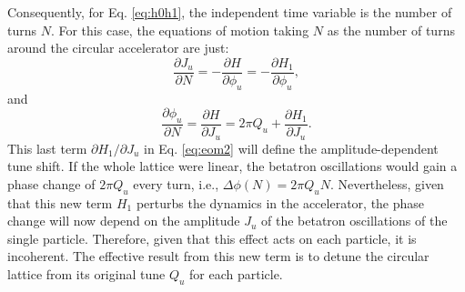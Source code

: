 Consequently, for Eq. \ref{eq:h0h1}, the independent time variable is the number of turns $N$. For this case, the equations of motion taking $N$ as the number of turns around the circular accelerator are just:
\begin{equation}
    \label{eq:eom1}
    \frac{\partial J_u}{\partial N} = -\frac{\partial H}{\partial \phi_u} = -\frac{\partial H_1}{\partial \phi_u},
\end{equation}
and
\begin{equation}
    \label{eq:eom2}
    \frac{\partial \phi_u}{\partial N} = \frac{\partial H}{\partial J_u} = 2\pi Q_u + \frac{\partial H_1}{\partial J_u}.
\end{equation}
This last term ${\partial H_1}/{\partial J_u}$ in Eq. \ref{eq:eom2} will define the amplitude-dependent tune shift. If the whole lattice were linear, the betatron oscillations would gain a phase change of $2\pi Q_u$ every turn, i.e., $\Delta \phi(N)=2\pi Q_u N$. Nevertheless, given that this new term $H_1$ perturbs the dynamics in the accelerator, the phase change will now depend on the amplitude $J_u$ of the betatron oscillations of the single particle. Therefore, given that this effect acts on each particle, it is incoherent. The effective result from this new term is to detune the circular lattice from its original tune $Q_u$ for each particle.

